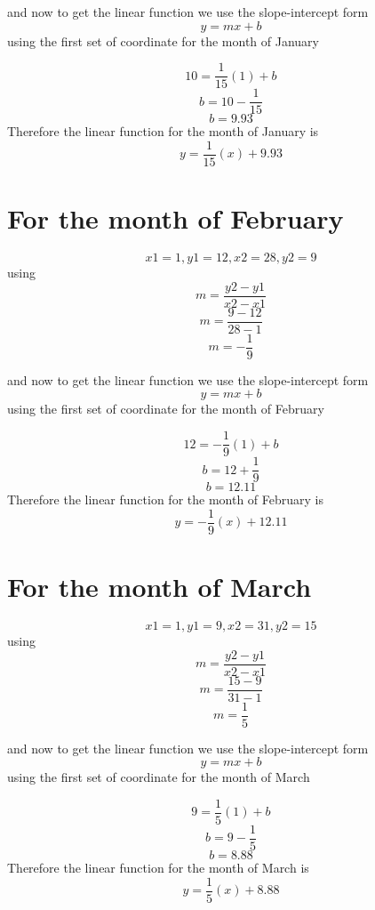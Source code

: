 \documentclass{article}
\begin{document}
and now to get the linear function we use the slope-intercept form\\ 
$${y=mx +b }$$
using the first set of coordinate for the month of January

$${10=\frac{1}{15}(1)+b}$$
$${b=10-\frac{1}{15}}$$
$${b=9.93}$$
Therefore the linear function for the month of January is$${y=\frac{1}{15}(x)+9.93}$$




\section *{\textbf {For the month of February}}
$${x1=1, y1=12, x2=28, y2=9}$$
using  $${m=\frac{y2-y1}{x2-x1}}$$
$${m=\frac{9-12}{28-1}}$$
$${m = -\frac{1}{9}}$$


and now to get the linear function we use the slope-intercept form\\ 
$${y=mx +b }$$
using the first set of coordinate for the month of February

$${12 = -\frac{1}{9}(1)+b}$$
$${b=12+\frac{1}{9}}$$
$${b=12.11}$$
Therefore the linear function for the month of February is $${y=-\frac{1}{9}(x)+12.11}$$





\section *{\textbf {For the month of March}}
$${x1=1, y1=9, x2=31, y2=15}$$
using  $${m=\frac{y2-y1}{x2-x1}}$$
$${m=\frac{15-9}{31-1}}$$
$${m = \frac{1}{5}}$$


and now to get the linear function we use the slope-intercept form\\ 
$${y = mx +b }$$
using the first set of coordinate for the month of March

$${9 = \frac{1}{5}(1)+b}$$
$${b=9-\frac{1}{5}}$$
$${b=8.88}$$
Therefore the linear function for the month of March is $${y=\frac{1}{5}(x)+8.88}$$
\end{document}

